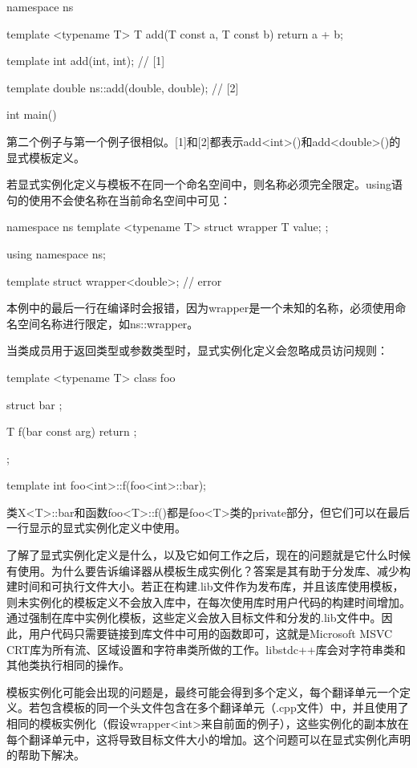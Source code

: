 \begin{cpp}
namespace ns
{
	template <typename T>
	T add(T const a, T const b)
	{
		return a + b;
	}

	template int add(int, int); // [1]
}

template double ns::add(double, double); // [2]

int main() { }
\end{cpp}

第二个例子与第一个例子很相似。[1]和[2]都表示add<int>()和add<double>()的显式模板定义。

若显式实例化定义与模板不在同一个命名空间中，则名称必须完全限定。using语句的使用不会使名称在当前命名空间中可见：

\begin{cpp}
namespace ns
{
	template <typename T>
	struct wrapper { T value; };
}

using namespace ns;

template struct wrapper<double>; // error
\end{cpp}

本例中的最后一行在编译时会报错，因为wrapper是一个未知的名称，必须使用命名空间名称进行限定，如ns::wrapper。

当类成员用于返回类型或参数类型时，显式实例化定义会忽略成员访问规则：

\begin{cpp}
template <typename T>
class foo
{
	struct bar {};
	
	T f(bar const arg)
	{
		return {};
	}
};

template int foo<int>::f(foo<int>::bar);
\end{cpp}

类X<T>::bar和函数foo<T>::f()都是foo<T>类的private部分，但它们可以在最后一行显示的显式实例化定义中使用。

了解了显式实例化定义是什么，以及它如何工作之后，现在的问题就是它什么时候有使用。为什么要告诉编译器从模板生成实例化？答案是其有助于分发库、减少构建时间和可执行文件大小。若正在构建.lib文件作为发布库，并且该库使用模板，则未实例化的模板定义不会放入库中，在每次使用库时用户代码的构建时间增加。通过强制在库中实例化模板，这些定义会放入目标文件和分发的.lib文件中。因此，用户代码只需要链接到库文件中可用的函数即可，这就是Microsoft MSVC CRT库为所有流、区域设置和字符串类所做的工作。libstdc++库会对字符串类和其他类执行相同的操作。

模板实例化可能会出现的问题是，最终可能会得到多个定义，每个翻译单元一个定义。若包含模板的同一个头文件包含在多个翻译单元（.cpp文件）中，并且使用了相同的模板实例化（假设wrapper<int>来自前面的例子），这些实例化的副本放在每个翻译单元中，这将导致目标文件大小的增加。这个问题可以在显式实例化声明的帮助下解决。


